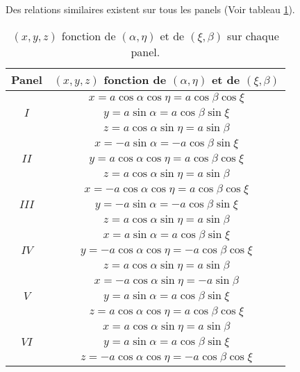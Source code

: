 Des relations similaires existent sur tous les panels (Voir tableau \ref{tab: x y z fct de xi eta alfa beta}).

\begin{table}[htbp]
\begin{center}
\begin{tabular}{|c|c|}
\hline
\textbf{Panel} & $(x,y,z)$ \textbf{fonction de} $(\alpha, \eta)$ \textbf{et de} $(\xi, \beta)$ \\

\hline
\hline
    & $x=a \cos \alpha \cos \eta  =  a \cos \beta \cos \xi$ \\ 
$I$ & $y=a \sin \alpha  =  a \cos \beta \sin \xi$ \\
    & $z=a \cos \alpha \sin \eta  =  a \sin \beta$ \\
\hline
\hline
      & $x=- a \sin \alpha  = - a \cos \beta \sin \xi$ \\ 
$II$  & $y=a \cos \alpha \cos \eta  =  a \cos \beta \cos \xi$ \\
      & $z=a \cos \alpha \sin \eta  =  a \sin \beta$ \\
\hline
\hline
      & $x=- a \cos \alpha \cos \eta = a \cos \beta \cos \xi$ \\ 
$III$ & $y=- a \sin \alpha = - a \cos \beta \sin \xi$ \\
      & $z=a \cos \alpha \sin \eta = a \sin \beta$ \\
\hline
\hline
      & $x=a \sin \alpha = a \cos \beta \sin \xi$ \\ 
$IV$  & $y=- a \cos \alpha \cos \eta = - a \cos \beta \cos \xi$ \\
      & $z=a \cos \alpha \sin \eta = a \sin \beta$ \\
\hline
\hline
    & $x=-a \cos \alpha \sin \eta = - a \sin \beta$ \\ 
$V$ & $y=a \sin \alpha = a \cos \beta \sin \xi$ \\
    & $z=a \cos \alpha \cos \eta = a \cos \beta \cos \xi$ \\
\hline
\hline
     & $x=a \cos \alpha \sin \eta = a \sin \beta$ \\ 
$VI$ & $y=a \sin \alpha = a \cos \beta \sin \xi$ \\
     & $z=- a \cos \alpha \cos \eta = - a \cos \beta \cos \xi$ \\
\hline
\end{tabular}
\end{center}
\caption{$(x,y,z)$ fonction de $(\alpha, \eta)$ et de $(\xi, \beta)$  sur chaque panel.}
\label{tab: x y z fct de xi eta alfa beta}
\end{table}


